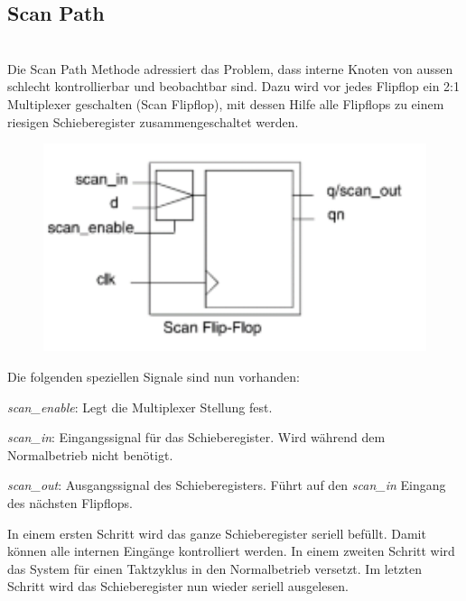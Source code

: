 \subsection{Scan Path}$~$ \\
Die Scan Path Methode adressiert das Problem, dass interne Knoten von aussen schlecht kontrollierbar und beobachtbar sind. Dazu wird vor jedes Flipflop ein 2:1 Multiplexer geschalten (Scan Flipflop), mit dessen Hilfe alle Flipflops zu einem riesigen Schieberegister zusammengeschaltet werden. \\
\begin{minipage}{0.25\textwidth}
\begin{figure}[H]
    \includegraphics[width=1.0\textwidth]{images/scanflipflop.png}
\end{figure}
\end{minipage}
\hfill
\begin{minipage}{0.7\textwidth}
Die folgenden speziellen Signale sind nun vorhanden:
\begin{compactitem}
    \item \textit{scan\_enable}: Legt die Multiplexer Stellung fest.
    \item \textit{scan\_in}: Eingangssignal für das Schieberegister. Wird während dem Normalbetrieb nicht benötigt.
    \item \textit{scan\_out}: Ausgangssignal des Schieberegisters. Führt auf den \textit{scan\_in} Eingang des nächsten Flipflops.
\end{compactitem}
\end{minipage}

In einem ersten Schritt wird das ganze Schieberegister seriell befüllt. Damit können alle internen Eingänge kontrolliert werden. In einem zweiten Schritt wird das System für einen Taktzyklus in den Normalbetrieb versetzt. Im letzten Schritt wird das Schieberegister nun wieder seriell ausgelesen.

